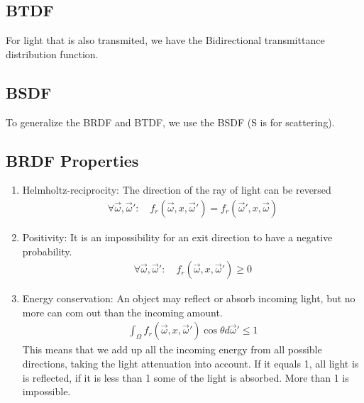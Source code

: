 \documentclass[../pbr.tex]{subfile}
\begin{document}
\subsection{BTDF}%
\label{sub:btdf}

For light that is also transmited, we have the Bidirectional transmittance
distribution function.

\begin{Figure}
  \begin{center}
    
  \end{center}
  \label{fig:03_3}
\end{Figure}

\subsection{BSDF}%
\label{sub:bsdf}

To generalize the BRDF and BTDF, we use the BSDF (S is for scattering).

\subsection{BRDF Properties}%
\label{sub:brdf_properties}

\begin{enumerate}
  \item Helmholtz-reciprocity: The direction of the ray of light can be
    reversed
    \begin{align*}
      \forall\vec{\omega},\vec{\omega}':\quad
      f_r\left(\vec{\omega},x,\vec{\omega}'\right)=f_r\left(\vec{\omega}',x,\vec{\omega}\right)
    \end{align*}
  \item Positivity: It is an impossibility for an exit direction to have a
    negative probability.
    \begin{align*}
      \forall\vec{\omega},\vec{\omega}':\quad
      f_r\left(\vec{\omega},x,\vec{\omega}'\right)\geq 0
    \end{align*}
  \item Energy conservation: An object may reflect or absorb incoming light,
    but no more can com out than the incoming amount.
    \begin{align*}
      \int_\Omega
      f_r\left(\vec{\omega},x,\vec{\omega}'\right)\cos\theta d\vec{\omega}'\leq
      1
    \end{align*}
    This means that we add up all the incoming energy from all possible
    directions, taking the light attenuation into account. If it equals 1, all
    light is is reflected, if it is less than 1 some of the light is absorbed.
    More than 1 is impossible.
\end{enumerate}
\end{document}
